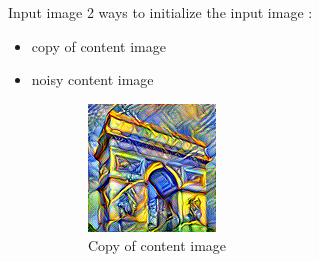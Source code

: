 \documentclass[12pt]{beamer}
\begin{document}
    \begin{frame}{Input image}
        2 ways to initialize the input image :
        
        \begin{itemize}
            \item copy of content image
            \item noisy content image
        \end{itemize}
    \end{frame}
    
    \begin{frame}
        \begin{figure}[H]
            \centering
            \begin{subfigure}[b]{0.45\textwidth}
                \centering
                \includegraphics[width=\textwidth]{resources/gatys/inputs/sun-trees-paris-copy.png}
                \caption{Copy of content image}
            \end{subfigure}
            \hfill
            \begin{subfigure}[b]{0.45\textwidth}
                \centering

\end{subfigure}
\end{figure}
\end{frame}
\end{document}
